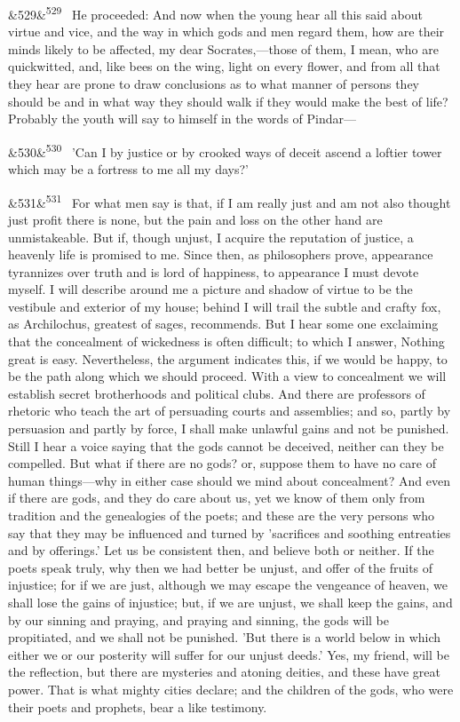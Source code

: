 \documentclass[12pt]{article}
\newcommand{\para}[1][]{\par\noindent\ifx&#1&\else\textsuperscript{\footnotesize #1}~\fi}
\begin{document}
\para[529] He proceeded: And now when the young hear all this said about virtue and vice, and the way in which gods and men regard them, how are their minds likely to be affected, my dear Socrates,---those of them, I mean, who are quickwitted, and, like bees on the wing, light on every flower, and from all that they hear are prone to draw conclusions as to what manner of persons they should be and in what way they should walk if they would make the best of life? Probably the youth will say to himself in the words of Pindar---

\para[530] 'Can I by justice or by crooked ways of deceit ascend a loftier tower which may be a fortress to me all my days?'

\para[531] For what men say is that, if I am really just and am not also thought just profit there is none, but the pain and loss on the other hand are unmistakeable. But if, though unjust, I acquire the reputation of justice, a heavenly life is promised to me. Since then, as philosophers prove, appearance tyrannizes over truth and is lord of happiness, to appearance I must devote myself. I will describe around me a picture and shadow of virtue to be the vestibule and exterior of my house; behind I will trail the subtle and crafty fox, as Archilochus, greatest of sages, recommends. But I hear some one exclaiming that the concealment of wickedness is often difficult; to which I answer, Nothing great is easy. Nevertheless, the argument indicates this, if we would be happy, to be the path along which we should proceed. With a view to concealment we will establish secret brotherhoods and political clubs. And there are professors of rhetoric who teach the art of persuading courts and assemblies; and so, partly by persuasion and partly by force, I shall make unlawful gains and not be punished. Still I hear a voice saying that the gods cannot be deceived, neither can they be compelled. But what if there are no gods? or, suppose them to have no care of human things---why in either case should we mind about concealment? And even if there are gods, and they do care about us, yet we know of them only from tradition and the genealogies of the poets; and these are the very persons who say that they may be influenced and turned by 'sacrifices and soothing entreaties and by offerings.' Let us be consistent then, and believe both or neither. If the poets speak truly, why then we had better be unjust, and offer of the fruits of injustice; for if we are just, although we may escape the vengeance of heaven, we shall lose the gains of injustice; but, if we are unjust, we shall keep the gains, and by our sinning and praying, and praying and sinning, the gods will be propitiated, and we shall not be punished. 'But there is a world below in which either we or our posterity will suffer for our unjust deeds.' Yes, my friend, will be the reflection, but there are mysteries and atoning deities, and these have great power. That is what mighty cities declare; and the children of the gods, who were their poets and prophets, bear a like testimony.
\end{document}
